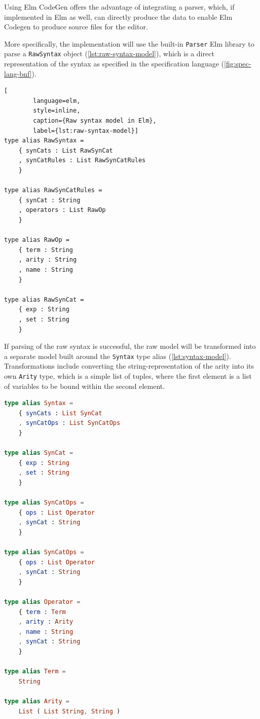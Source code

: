 Using Elm CodeGen offers the advantage of integrating a parser, which,
if implemented in Elm as well, can directly produce the data to enable
Elm Codegen to produce source files for the editor.

More specifically, the implementation will use the built-in \texttt{Parser} Elm
library to parse a \texttt{RawSyntax} object (\cref{lst:raw-syntax-model}),
which is a direct representation of the syntax as specified in the specification
language (\cref{fig:spec-lang-bnf}).

\begin{lstlisting}[
        language=elm,
        style=inline,
        caption={Raw syntax model in Elm},
        label={lst:raw-syntax-model}]
type alias RawSyntax =
    { synCats : List RawSynCat
    , synCatRules : List RawSynCatRules
    }

type alias RawSynCatRules =
    { synCat : String
    , operators : List RawOp
    }

type alias RawOp =
    { term : String
    , arity : String
    , name : String
    }

type alias RawSynCat =
    { exp : String
    , set : String
    }
\end{lstlisting}

If parsing of the raw syntax is successful, the raw model will
be transformed into a separate model built around the \texttt{Syntax}
type alias (\cref{lst:syntax-model}).
Transformations include converting the string-representation of the arity
into its own \texttt{Arity} type, which is a simple list of tuples,
where the first element is a list of variables to be bound within the second element.

\begin{lstlisting}[language=elm,style=inline,caption={Syntax model},label={lst:syntax-model}]
type alias Syntax =
    { synCats : List SynCat
    , synCatOps : List SynCatOps
    }

type alias SynCat =
    { exp : String
    , set : String
    }

type alias SynCatOps =
    { ops : List Operator
    , synCat : String
    }

type alias SynCatOps =
    { ops : List Operator
    , synCat : String
    }

type alias Operator =
    { term : Term
    , arity : Arity
    , name : String
    , synCat : String
    }

type alias Term =
    String

type alias Arity =
    List ( List String, String )
\end{lstlisting}

